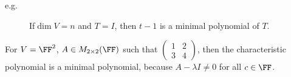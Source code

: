 \documentclass[11pt]{scrartcl}
\begin{document}
\begin{description}

\item[e.g.] If$\dim V = n$ and $T=I$, then $t-1$ is a minimal polynomial of $T$.

\end{description}

\begin{example}

  For $V = \FF^2$, $A \in M_{2\times 2}(\FF) $ such that $\begin{pmatrix}
1 &2 \\
3 & 4
\end{pmatrix}$, then the characteristic polynomial is a minimal
polynomial, because $A-\lambda I \neq 0$ for all $c\in\FF$.

\end{example}
\end{document}
